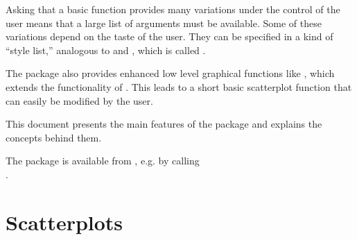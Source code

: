 \documentclass[11pt]{article}\usepackage[]{graphicx}\usepackage[]{color}
\begin{document}
Asking that a basic function provides many variations under the control of
the user means that a large list of arguments must be available.
Some of these variations depend on the taste of the user. 
They can be specified in a kind of ``style list,'' analogous to 
 and , which is called .

The package also provides enhanced low level graphical functions
like , which extends the functionality of .
This leads to a short basic scatterplot function  that can
easily be modified by the user.

This document presents the main features of the package 
and explains the concepts behind them. 

The package is available from , e.g. by calling\\
.\\

\section{Scatterplots}
\end{document}
